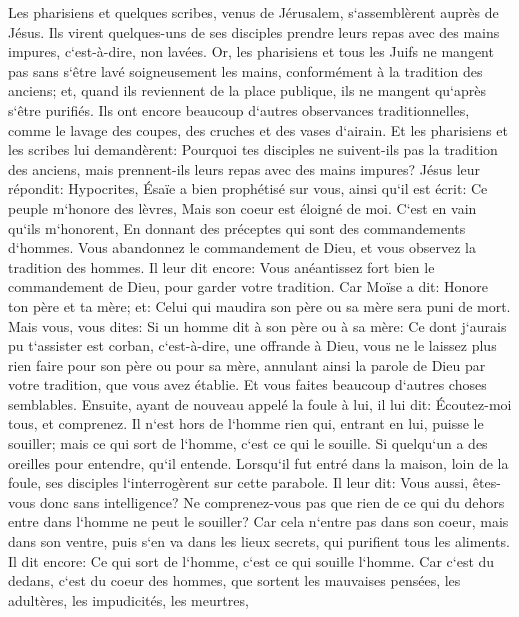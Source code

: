 \verse Les pharisiens et quelques scribes, venus de Jérusalem, s`assemblèrent auprès de Jésus. 
\verse Ils virent quelques-uns de ses disciples prendre leurs repas avec des mains impures, c`est-à-dire, non lavées. 
\verse Or, les pharisiens et tous les Juifs ne mangent pas sans s`être lavé soigneusement les mains, conformément à la tradition des anciens; 
\verse et, quand ils reviennent de la place publique, ils ne mangent qu`après s`être purifiés. Ils ont encore beaucoup d`autres observances traditionnelles, comme le lavage des coupes, des cruches et des vases d`airain. 
\verse Et les pharisiens et les scribes lui demandèrent: Pourquoi tes disciples ne suivent-ils pas la tradition des anciens, mais prennent-ils leurs repas avec des mains impures? 
\verse Jésus leur répondit: Hypocrites, Ésaïe a bien prophétisé sur vous, ainsi qu`il est écrit: Ce peuple m`honore des lèvres, Mais son coeur est éloigné de moi. 
\verse C`est en vain qu`ils m`honorent, En donnant des préceptes qui sont des commandements d`hommes. 
\verse Vous abandonnez le commandement de Dieu, et vous observez la tradition des hommes. 
\verse Il leur dit encore: Vous anéantissez fort bien le commandement de Dieu, pour garder votre tradition. 
\verse Car Moïse a dit: Honore ton père et ta mère; et: Celui qui maudira son père ou sa mère sera puni de mort. 
\verse Mais vous, vous dites: Si un homme dit à son père ou à sa mère: Ce dont j`aurais pu t`assister est corban, c`est-à-dire, une offrande à Dieu, 
\verse vous ne le laissez plus rien faire pour son père ou pour sa mère, 
\verse annulant ainsi la parole de Dieu par votre tradition, que vous avez établie. Et vous faites beaucoup d`autres choses semblables. 
\verse Ensuite, ayant de nouveau appelé la foule à lui, il lui dit: Écoutez-moi tous, et comprenez. 
\verse Il n`est hors de l`homme rien qui, entrant en lui, puisse le souiller; mais ce qui sort de l`homme, c`est ce qui le souille. 
\verse Si quelqu`un a des oreilles pour entendre, qu`il entende. 
\verse Lorsqu`il fut entré dans la maison, loin de la foule, ses disciples l`interrogèrent sur cette parabole. 
\verse Il leur dit: Vous aussi, êtes-vous donc sans intelligence? Ne comprenez-vous pas que rien de ce qui du dehors entre dans l`homme ne peut le souiller? 
\verse Car cela n`entre pas dans son coeur, mais dans son ventre, puis s`en va dans les lieux secrets, qui purifient tous les aliments. 
\verse Il dit encore: Ce qui sort de l`homme, c`est ce qui souille l`homme. 
\verse Car c`est du dedans, c`est du coeur des hommes, que sortent les mauvaises pensées, les adultères, les impudicités, les meurtres, 
